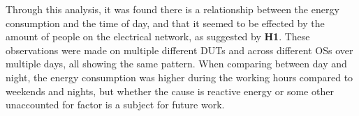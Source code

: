 Through this analysis, it was found there is a relationship between the energy consumption and the time of day, and that it seemed to be effected by the amount of people on the electrical network, as suggested by \textbf{H1}. These observations were made on multiple different DUTs and across different OSs over multiple days, all showing the same pattern. When comparing between day and night, the energy consumption was higher during the working hours compared to weekends and nights, but whether the cause is reactive energy or some other unaccounted for factor is a subject for future work.










